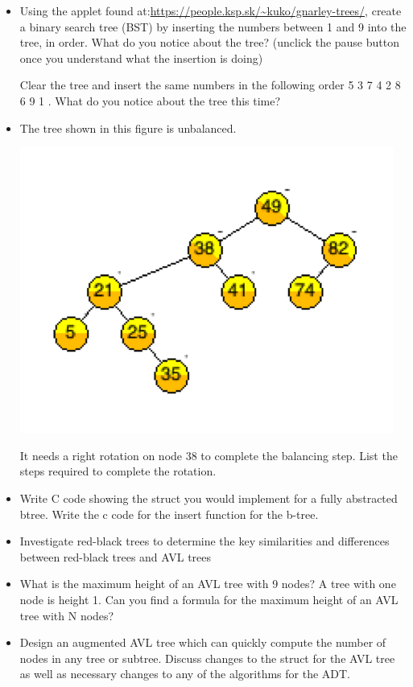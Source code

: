 \begin{itemize}
\item {Using the applet found at:\url{https://people.ksp.sk/\~kuko/gnarley-trees/}, create a binary search tree (BST) by inserting the numbers between 1 and 9 into the tree, in order. What do you notice about the tree? (unclick the pause button once you understand what the insertion is doing)

Clear the tree and insert the same numbers in the following order 5 3 7 4 2 8 6 9 1 . What do you notice about the tree this time?}

\item {The tree shown in this figure is unbalanced.

  \includegraphics{pictures/tree9.png}

It needs a right rotation on node 38 to complete the balancing step.  List the steps required to complete the rotation.}

\item{ Write  C code showing the struct you would implement for a fully abstracted btree.  Write the c code for the insert function for the b-tree. }

\item{Investigate red-black trees to determine the key similarities and differences between red-black trees and AVL trees}

\item{What is the maximum height of an AVL tree with 9 nodes?  A tree with one node is height 1.   Can you find a formula for the maximum height of an AVL tree with N nodes? }

\item{Design an augmented AVL tree which can quickly compute the number of nodes in any tree or subtree.  Discuss changes to the struct for the AVL tree as well as necessary changes to any of the algorithms for the ADT.}

\end{itemize}
